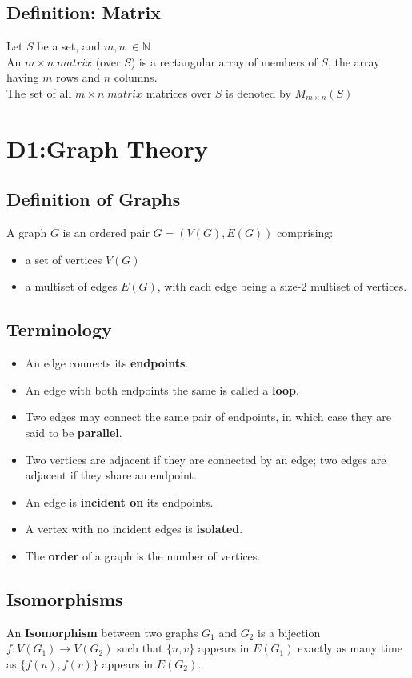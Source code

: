 \documentclass{article}
\begin{document}
\begin{spacing}{1.5}
\subsection{Definition: Matrix}
Let $S$ be a set, and $m,n \; \in \mathbb{N}  $\\
An $m \times n \; matrix $ (over $S$) is a rectangular array of members of $S$,
the array having $m$ rows and $n$ columns. \\
The set of all $m \times n \; matrix $ matrices over $S$ is denoted by $M_{m \times n}(S)$\\
\section{D1:Graph Theory}
\subsection{Definition of Graphs}
A graph $G$ is an ordered pair $G = (V(G),E(G)) $ comprising:
\begin{itemize}
    \item a set of vertices $V(G)$
    \item a multiset of edges $E(G)$, with each edge being a size-2 multiset of vertices. 
\end{itemize} 
\subsection{Terminology}
\begin{itemize}
    \item An edge connects its \textbf{endpoints}.
    \item An edge with both endpoints the same is called a \textbf{loop}.
    \item Two edges may connect the same pair of endpoints, in which case they are said to be \textbf{parallel}.
    \item Two vertices are adjacent if they are connected by an edge; two edges are adjacent if they share an endpoint. 
    \item An edge is \textbf{incident on} its endpoints.
    \item A vertex with no incident edges is \textbf{isolated}.
    \item The \textbf{order} of a graph is the number of vertices. 
\end{itemize}
\subsection{Isomorphisms}
An \textbf{Isomorphism} between two graphs $G_1$ and $G_2$ is a bijection $f:V(G_1) \rightarrow V(G_2)$ such that $\{u,v\}$ appears in $E(G_1)$ exactly as many time as $\{f(u),f(v)\}$ appears in $E(G_2)$.

\end{spacing}
\end{document}
